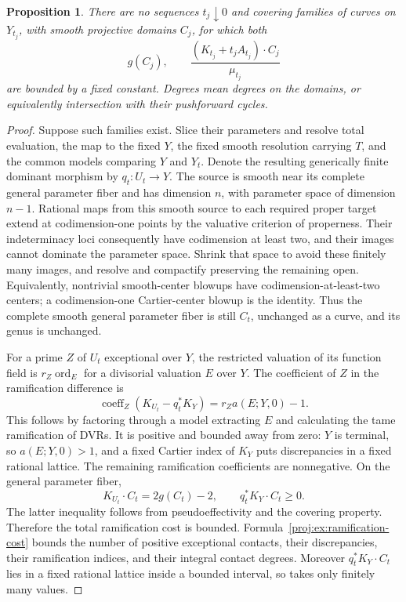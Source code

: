 \documentclass[11pt,letterpaper]{article}
\DeclareMathOperator{\ord}{ord}
\newtheorem{proposition}[theorem]{Proposition}
\theoremstyle{definition}
\theoremstyle{remark}
\begin{document}
\begin{proposition}\label{proj:prop:bounded-curves}
There are no sequences \(t_j\downarrow0\) and covering
families of curves on \(Y_{t_j}\), with smooth projective
domains \(C_j\), for which both
\[
 g(C_j),\qquad
 \frac{(K_{t_j}+t_jA_{t_j})\cdot C_j}{\mu_{t_j}}
\]
are bounded by a fixed constant. Degrees mean degrees on
the domains, or equivalently intersection with their
pushforward cycles.
\end{proposition}
\begin{proof}
Suppose such families exist. Slice their parameters and
resolve total evaluation, the map to the fixed \(Y\), the
fixed smooth resolution carrying \(T\), and the common
models comparing \(Y\) and \(Y_t\). Denote the resulting
generically finite dominant morphism by \(q_t:U_t\to Y\).
The source is smooth near its complete general parameter
fiber and has dimension \(n\), with parameter space of
dimension \(n-1\). Rational maps from this smooth source
to each required proper target extend at codimension-one
points by the valuative criterion of properness. Their
indeterminacy loci consequently have codimension at least
two, and their images cannot dominate the parameter space.
Shrink that space to avoid these finitely many images,
and resolve and compactify preserving the remaining open.
Equivalently, nontrivial smooth-center blowups have
codimension-at-least-two centers; a codimension-one
Cartier-center blowup is the identity. Thus the complete
smooth general parameter fiber is still \(C_t\), unchanged
as a curve, and its genus is unchanged.

For a prime \(Z\) of \(U_t\) exceptional over \(Y\), the
restricted valuation of its function field is
\(r_Z\ord_E\) for a divisorial valuation \(E\) over \(Y\).
The coefficient of \(Z\) in the ramification difference is
\begin{equation}\label{proj:ex:ramification-cost}
 \operatorname{coeff}_Z(K_{U_t}-q_t^*K_Y)
       =r_Za(E;Y,0)-1.
\end{equation}
This follows by factoring through a model extracting \(E\)
and calculating the tame ramification of DVRs. It is
positive and bounded away from zero: \(Y\) is terminal,
so \(a(E;Y,0)>1\), and a fixed Cartier index of \(K_Y\)
puts discrepancies in a fixed rational lattice. The
remaining ramification coefficients are nonnegative.
On the general parameter fiber,
\[
 K_{U_t}\cdot C_t=2g(C_t)-2,\qquad
 q_t^*K_Y\cdot C_t\geq0.
 \]
The latter inequality follows from pseudoeffectivity and
the covering property. Therefore the total ramification
cost is bounded. Formula~\eqref{proj:ex:ramification-cost}
bounds the number of positive exceptional contacts,
their discrepancies, their ramification indices, and
their integral contact degrees. Moreover
\(q_t^*K_Y\cdot C_t\) lies in a fixed rational lattice
inside a bounded interval, so takes only finitely many
values.


\end{proof}
\end{document}

